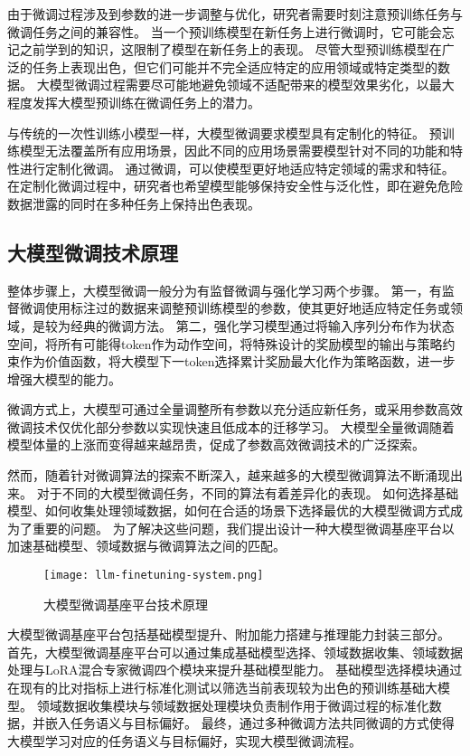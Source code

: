 由于微调过程涉及到参数的进一步调整与优化，研究者需要时刻注意预训练任务与微调任务之间的兼容性。
当一个预训练模型在新任务上进行微调时，它可能会忘记之前学到的知识，这限制了模型在新任务上的表现。
尽管大型预训练模型在广泛的任务上表现出色，但它们可能并不完全适应特定的应用领域或特定类型的数据。
大模型微调过程需要尽可能地避免领域不适配带来的模型效果劣化，以最大程度发挥大模型预训练在微调任务上的潜力。

与传统的一次性训练小模型一样，大模型微调要求模型具有定制化的特征。
预训练模型无法覆盖所有应用场景，因此不同的应用场景需要模型针对不同的功能和特性进行定制化微调。
通过微调，可以使模型更好地适应特定领域的需求和特征。
在定制化微调过程中，研究者也希望模型能够保持安全性与泛化性，即在避免危险数据泄露的同时在多种任务上保持出色表现。

\subsection{大模型微调技术原理}

整体步骤上，大模型微调一般分为有监督微调与强化学习两个步骤。
第一，有监督微调使用标注过的数据来调整预训练模型的参数，使其更好地适应特定任务或领域，是较为经典的微调方法。
第二，强化学习模型通过将输入序列分布作为状态空间，将所有可能得token作为动作空间，将特殊设计的奖励模型的输出与策略约束作为价值函数，将大模型下一token选择累计奖励最大化作为策略函数，进一步增强大模型的能力。

微调方式上，大模型可通过全量调整所有参数以充分适应新任务，或采用参数高效微调技术仅优化部分参数以实现快速且低成本的迁移学习。
大模型全量微调随着模型体量的上涨而变得越来越昂贵，促成了参数高效微调技术的广泛探索。

然而，随着针对微调算法的探索不断深入，越来越多的大模型微调算法不断涌现出来。
对于不同的大模型微调任务，不同的算法有着差异化的表现。
如何选择基础模型、如何收集处理领域数据，如何在合适的场景下选择最优的大模型微调方式成为了重要的问题。
为了解决这些问题，我们提出设计一种大模型微调基座平台以加速基础模型、领域数据与微调算法之间的匹配。

\begin{figure}
  \centering
  \texttt{[image: llm-finetuning-system.png]}
  \caption{大模型微调基座平台技术原理}
  \label{fig:finetuningsys}
\end{figure}

大模型微调基座平台包括基础模型提升、附加能力搭建与推理能力封装三部分。
首先，大模型微调基座平台可以通过集成基础模型选择、领域数据收集、领域数据处理与LoRA混合专家微调四个模块来提升基础模型能力。
基础模型选择模块通过在现有的比对指标上进行标准化测试以筛选当前表现较为出色的预训练基础大模型。
领域数据收集模块与领域数据处理模块负责制作用于微调过程的标准化数据，并嵌入任务语义与目标偏好。
最终，通过多种微调方法共同微调的方式使得大模型学习对应的任务语义与目标偏好，实现大模型微调流程。

